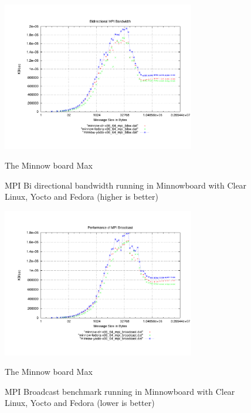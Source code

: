 \begin{figure}[H]
\centering
\includegraphics[width=0.75\textwidth]{images/mpbench_yocto_experiments/mpi_bibw.pdf}
\caption{The Minnow board Max}
\caption{MPI Bi directional bandwidth running in Minnowboard with Clear Linux,
Yocto and Fedora (higher is better)}
\label{fig:5.10}
\end{figure}


\begin{figure}[H]
\centering
\includegraphics[width=0.75\textwidth]{images/mpbench_yocto_experiments/mpi_broadcast.pdf}
\caption{The Minnow board Max}
\caption{MPI Broadcast benchmark running in Minnowboard with Clear Linux, Yocto
and Fedora (lower is better)}
\label{fig:5.11}
\end{figure}

